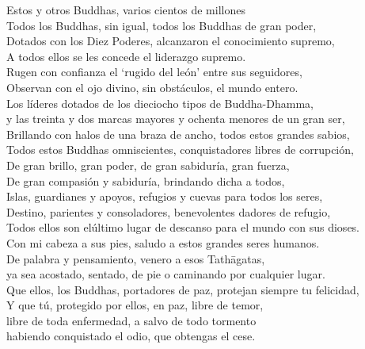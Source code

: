 \begin{onechants}
Estos y otros Buddhas, varios cientos de millones\\
Todos los Buddhas, sin igual, todos los Buddhas de gran poder,\\
Dotados con los Diez Poderes, alcanzaron el conocimiento supremo,\\
A todos ellos se les concede el liderazgo supremo.\\
Rugen con confianza el ‘rugido del león’ entre sus seguidores,\\
Observan con el ojo divino, sin obstáculos, el mundo entero.\\
Los líderes dotados de los dieciocho tipos de Buddha-Dhamma,\\
y las treinta y dos marcas mayores y ochenta menores de un gran ser,\\
Brillando con halos de una braza de ancho, todos estos grandes sabios,\\
Todos estos Buddhas omniscientes, conquistadores libres de corrupción,\\
De gran brillo, gran poder, de gran sabiduría, gran fuerza,\\
De gran compasión y sabiduría, brindando dicha a todos,\\
Islas, guardianes y apoyos, refugios y cuevas para todos los seres,\\
Destino, parientes y consoladores, benevolentes dadores de refugio,\\
Todos ellos son elúltimo lugar de descanso para el mundo con sus dioses.\\
Con mi cabeza a sus pies, saludo a estos grandes seres humanos.\\
De palabra y pensamiento, venero a esos Tathāgatas,\\
ya sea acostado, sentado, de pie o caminando por cualquier lugar.\\
Que ellos, los Buddhas, portadores de paz, protejan siempre tu felicidad,\\
Y que tú, protegido por ellos, en paz, libre de temor,\\
libre de toda enfermedad, a salvo de todo tormento\\
habiendo conquistado el odio, que obtengas el cese.\\

\end{onechants}

\clearpage

\paliText

